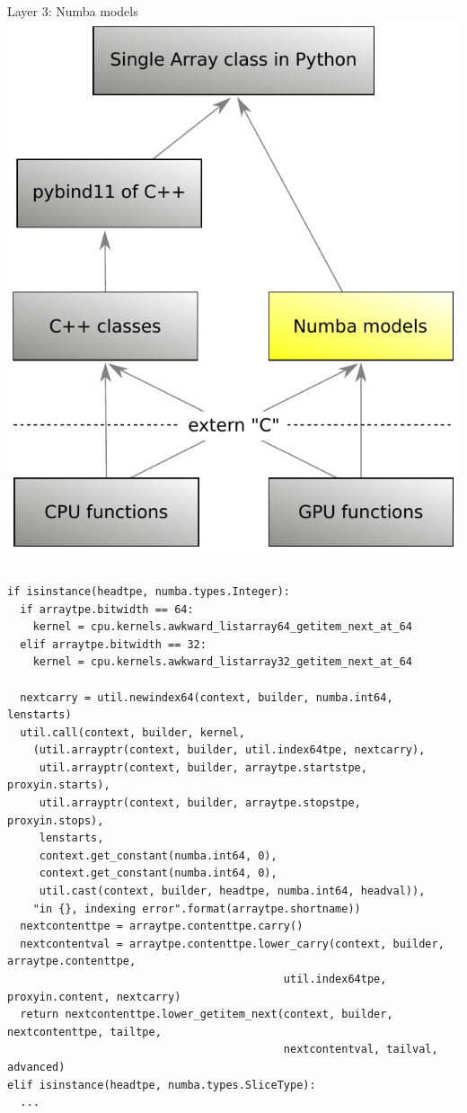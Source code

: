 \documentclass[aspectratio=169]{beamer}
\begin{document}
\begin{frame}[fragile]{Layer 3: Numba models}
\vspace{0.5 cm}
\hfill\mbox{\includegraphics[height=4 cm]{awkward-1-0-layers-mini-numba.pdf}\hspace{-0.75 cm}}

\scriptsize
\vspace{-4.45 cm}
\begin{columns}
\begin{verbatim}
if isinstance(headtpe, numba.types.Integer):
  if arraytpe.bitwidth == 64:
    kernel = cpu.kernels.awkward_listarray64_getitem_next_at_64
  elif arraytpe.bitwidth == 32:
    kernel = cpu.kernels.awkward_listarray32_getitem_next_at_64

  nextcarry = util.newindex64(context, builder, numba.int64, lenstarts)
  util.call(context, builder, kernel,
    (util.arrayptr(context, builder, util.index64tpe, nextcarry),
     util.arrayptr(context, builder, arraytpe.startstpe, proxyin.starts),
     util.arrayptr(context, builder, arraytpe.stopstpe, proxyin.stops),
     lenstarts,
     context.get_constant(numba.int64, 0),
     context.get_constant(numba.int64, 0),
     util.cast(context, builder, headtpe, numba.int64, headval)),
    "in {}, indexing error".format(arraytpe.shortname))
  nextcontenttpe = arraytpe.contenttpe.carry()
  nextcontentval = arraytpe.contenttpe.lower_carry(context, builder, arraytpe.contenttpe,
                                           util.index64tpe, proxyin.content, nextcarry)
  return nextcontenttpe.lower_getitem_next(context, builder, nextcontenttpe, tailtpe,
                                           nextcontentval, tailval, advanced)
elif isinstance(headtpe, numba.types.SliceType):
  ...
\end{verbatim}
\end{columns}
\vspace{1 cm}
\end{frame}
\end{document}
